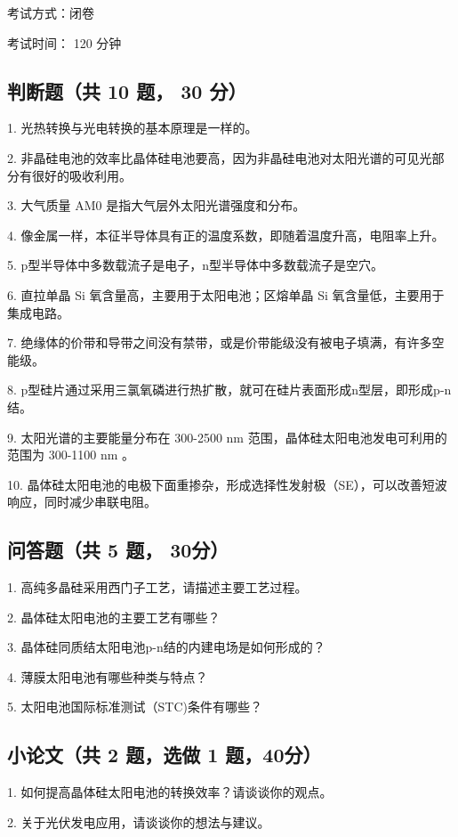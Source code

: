 \documentclass{article}
\begin{document}
考试方式：闭卷

考试时间： 120 分钟

\subsection{判断题（共 10 题， 30 分）}

1. 光热转换与光电转换的基本原理是一样的。

2. 非晶硅电池的效率比晶体硅电池要高，因为非晶硅电池对太阳光谱的可见光部分有很好的吸收利用。

3. 大气质量 AM0 是指大气层外太阳光谱强度和分布。

4. 像金属一样，本征半导体具有正的温度系数，即随着温度升高，电阻率上升。

5. p型半导体中多数载流子是电子，n型半导体中多数载流子是空穴。

6. 直拉单晶 Si 氧含量高，主要用于太阳电池；区熔单晶 Si 氧含量低，主要用于集成电路。

7. 绝缘体的价带和导带之间没有禁带，或是价带能级没有被电子填满，有许多空能级。

8. p型硅片通过采用三氯氧磷进行热扩散，就可在硅片表面形成n型层，即形成p-n结。

9. 太阳光谱的主要能量分布在 300-2500 nm 范围，晶体硅太阳电池发电可利用的范围为 300-1100 nm 。

10. 晶体硅太阳电池的电极下面重掺杂，形成选择性发射极（SE），可以改善短波响应，同时减少串联电阻。

\subsection{问答题（共 5 题， 30分）}

1. 高纯多晶硅采用西门子工艺，请描述主要工艺过程。

2. 晶体硅太阳电池的主要工艺有哪些？

3. 晶体硅同质结太阳电池p-n结的内建电场是如何形成的？

4. 薄膜太阳电池有哪些种类与特点？

5. 太阳电池国际标准测试（STC)条件有哪些？

\subsection{小论文（共 2 题，选做 1 题，40分）}

1. 如何提高晶体硅太阳电池的转换效率？请谈谈你的观点。

2. 关于光伏发电应用，请谈谈你的想法与建议。
\end{document}
